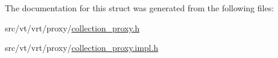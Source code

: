 The documentation for this struct was generated from the following files\+:\begin{DoxyCompactItemize}
\item 
src/vt/vrt/proxy/\hyperlink{collection__proxy_8h}{collection\+\_\+proxy.\+h}\item 
src/vt/vrt/proxy/\hyperlink{collection__proxy_8impl_8h}{collection\+\_\+proxy.\+impl.\+h}\end{DoxyCompactItemize}
